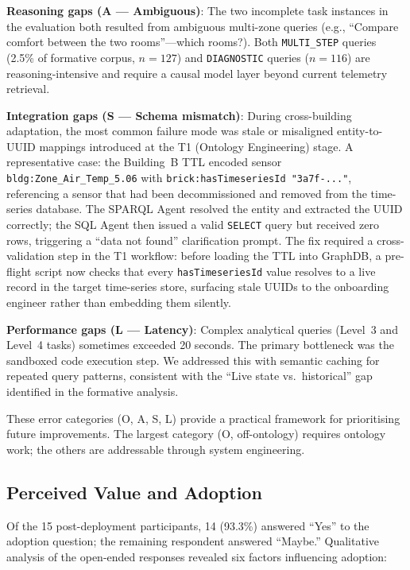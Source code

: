 \documentclass[acmsmall]{acmart}
\begin{document}
\textbf{Reasoning gaps (A --- Ambiguous)}: The two incomplete task instances in the evaluation both resulted from ambiguous multi-zone queries (e.g., ``Compare comfort between the two rooms''---which rooms?). Both \texttt{MULTI\_STEP} queries (2.5\% of formative corpus, $n=127$) and \texttt{DIAGNOSTIC} queries ($n=116$) are reasoning-intensive and require a causal model layer beyond current telemetry retrieval.

\textbf{Integration gaps (S --- Schema mismatch)}: During cross-building adaptation, the most common failure mode was stale or misaligned entity-to-UUID mappings introduced at the T1 (Ontology Engineering) stage. A representative case: the Building~B TTL encoded sensor \texttt{bldg:Zone\_Air\_Temp\_5.06} with \texttt{brick:hasTimeseriesId "3a7f-..."}, referencing a sensor that had been decommissioned and removed from the time-series database. The SPARQL Agent resolved the entity and extracted the UUID correctly; the SQL Agent then issued a valid \texttt{SELECT} query but received zero rows, triggering a ``data not found'' clarification prompt. The fix required a cross-validation step in the T1 workflow: before loading the TTL into GraphDB, a pre-flight script now checks that every \texttt{hasTimeseriesId} value resolves to a live record in the target time-series store, surfacing stale UUIDs to the onboarding engineer rather than embedding them silently.

\textbf{Performance gaps (L --- Latency)}: Complex analytical queries (Level~3 and Level~4 tasks) sometimes exceeded 20 seconds. The primary bottleneck was the sandboxed code execution step. We addressed this with semantic caching for repeated query patterns, consistent with the ``Live state vs.\ historical'' gap identified in the formative analysis.

These error categories (O, A, S, L) provide a practical framework for prioritising future improvements. The largest category (O, off-ontology) requires ontology work; the others are addressable through system engineering.

\subsection{Perceived Value and Adoption}
\label{sec:rq3-value}

Of the 15 post-deployment participants, 14 (93.3\%) answered ``Yes'' to the adoption question; the remaining respondent answered ``Maybe.'' Qualitative analysis of the open-ended responses revealed six factors influencing adoption:
\end{document}
